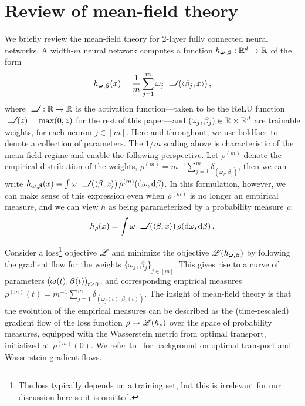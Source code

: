 \documentclass{custom}
\begin{document}
\section{Review of mean-field theory}\label{sec:mf}


We briefly review the mean-field theory for 2-layer fully connected neural networks.
A width-$m$ neural network computes a function $h_{\boldsymbol \omega,\boldsymbol \beta} :\mathbb R^d\to\mathbb R$ of the form
\begin{align*}
    h_{\bs\omega,\bs\beta}(x) = \frac{1}{m} \sum_{j=1}^m \omega_j \ReLU(\langle \beta_j, x\rangle)\,,
\end{align*}
where $\operatorname{\ReLU}\; : \R\to\R$ is the activation function---taken to be the ReLU function $\ReLU(z) = \max(0, z)$ for the rest of this paper---and $(\omega_j,\beta_j) \in \mathbb R\times\mathbb R^d$ are trainable weights, for each neuron $j\in [m]$.
Here and throughout, we use boldface to denote a collection of parameters.
The $1/m$ scaling above is characteristic of the mean-field regime and enable the following perspective. Let $\rho^{(m)}$ denote the empirical distribution of the weights, $\rho^{(m)} = m^{-1} \sum_{j=1}^m \delta_{(\omega_j,\beta_j)}$, then we can write $h_{\bs\omega,\bs\beta}(x) = \int \omega \ReLU(\langle \beta,x\rangle)\,\rho^{(m)}(\D \omega,\D \beta)$.
In this formulation, however, we can make sense of this expression even when $\rho^{(m)}$ is no longer an empirical measure, and we can view $h$ as being parameterized by a probability measure $\rho$:
\begin{align}\label{eq:hrho}
    h_\rho(x) = \int \omega\ReLU(\langle \beta,x\rangle)\,\rho(\D \omega,\D\beta)\,.
\end{align}

Consider a loss\footnote{The loss typically depends on a training set, but this is irrelevant for our discussion here so it is omitted.} objective $\mathscr L$ and minimize the objective $\mathscr L(h_{\boldsymbol \omega,\boldsymbol \beta})$ by following the gradient flow for the weights ${\{\omega_j,\beta_j\}}_{j\in [m]}$.
This gives rise to a curve of parameters ${(\boldsymbol \omega(t), \boldsymbol \beta(t))}_{t\ge 0}$, and corresponding empirical measures $\rho^{(m)}(t) = m^{-1} \sum_{j=1}^m \delta_{(\omega_j(t),\beta_j(t))}$.
The insight of mean-field theory is that the evolution of the empirical measures can be described as the (time-rescaled) gradient flow of the loss function $\rho \mapsto \mathscr L(h_\rho)$ over the space of probability measures, equipped with the Wasserstein metric from optimal transport, initialized at $\rho^{(m)}(0)$.
We refer to~\citet{Vil03Topics, AGS, Vil09OT, San15OT} for background on optimal transport and Wasserstein gradient flows.
\end{document}
